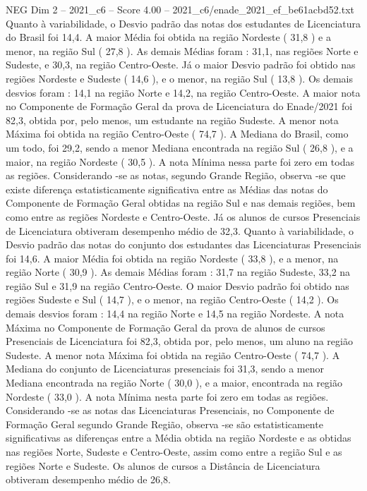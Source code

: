 \begin{textsample}{NEG Dim 2 – 2021\_c6 – Score 4.00 – 2021\_c6/enade\_2021\_ef\_be61acbd52.txt}
Quanto à variabilidade, o Desvio padrão das notas dos estudantes de Licenciatura do Brasil foi 14,4.
A maior Média foi obtida na região Nordeste ( 31,8 ) e a menor, na região Sul ( 27,8 ).
As demais Médias foram : 31,1, nas regiões Norte e Sudeste, e 30,3, na região Centro-Oeste.
Já o maior Desvio padrão foi obtido nas regiões Nordeste e Sudeste ( 14,6 ), e o menor, na região Sul ( 13,8 ).
Os demais desvios foram : 14,1 na região Norte e 14,2, na região Centro-Oeste.
A maior nota no Componente de Formação Geral da prova de Licenciatura do Enade/2021 foi 82,3, obtida por, pelo menos, um estudante na região Sudeste.
A menor nota Máxima foi obtida na região Centro-Oeste ( 74,7 ).
A Mediana do Brasil, como um todo, foi 29,2, sendo a menor Mediana encontrada na região Sul ( 26,8 ), e a maior, na região Nordeste ( 30,5 ).
A nota Mínima nessa parte foi zero em todas as regiões.
Considerando -se as notas, segundo Grande Região, observa -se que existe diferença estatisticamente significativa entre as Médias das notas do Componente de Formação Geral obtidas na região Sul e nas demais regiões, bem como entre as regiões Nordeste e Centro-Oeste.
Já os alunos de cursos Presenciais de Licenciatura obtiveram desempenho médio de 32,3.
Quanto à variabilidade, o Desvio padrão das notas do conjunto dos estudantes das Licenciaturas Presenciais foi 14,6.
A maior Média foi obtida na região Nordeste ( 33,8 ), e a menor, na região Norte ( 30,9 ).
As demais Médias foram : 31,7 na região Sudeste, 33,2 na região Sul e 31,9 na região Centro-Oeste.
O maior Desvio padrão foi obtido nas regiões Sudeste e Sul ( 14,7 ), e o menor, na região Centro-Oeste ( 14,2 ).
Os demais desvios foram : 14,4 na região Norte e 14,5 na região Nordeste.
A nota Máxima no Componente de Formação Geral da prova de alunos de cursos Presenciais de Licenciatura foi 82,3, obtida por, pelo menos, um aluno na região Sudeste.
A menor nota Máxima foi obtida na região Centro-Oeste ( 74,7 ).
A Mediana do conjunto de Licenciaturas presenciais foi 31,3, sendo a menor Mediana encontrada na região Norte ( 30,0 ), e a maior, encontrada na região Nordeste ( 33,0 ).
A nota Mínima nesta parte foi zero em todas as regiões.
Considerando -se as notas das Licenciaturas Presenciais, no Componente de Formação Geral segundo Grande Região, observa -se são estatisticamente significativas as diferenças entre a Média obtida na região Nordeste e as obtidas nas regiões Norte, Sudeste e Centro-Oeste, assim como entre a região Sul e as regiões Norte e Sudeste.
Os alunos de cursos a Distância de Licenciatura obtiveram desempenho médio de 26,8.

\end{textsample}
